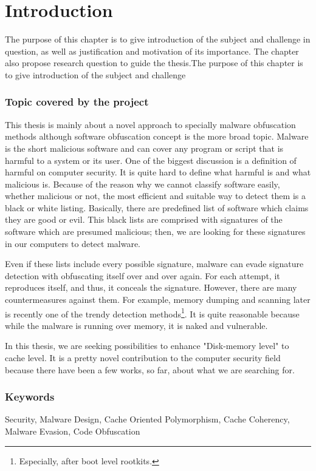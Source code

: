 \chapter{Introduction}
The purpose of this chapter is to give introduction of the subject and challenge in question, as well as justification and motivation of its importance. The chapter also propose research question to guide the thesis.The purpose of this chapter is to give introduction of the subject and challenge

\subsection{Topic covered by the project}
This thesis is mainly about a novel approach to specially malware obfuscation methods although software obfuscation concept is the more broad topic. Malware is the short malicious software and can cover any program or script that is harmful to a system or its user. One of the biggest discussion is a definition of harmful on computer security. It is quite hard to define what harmful is and what malicious is. Because of the reason why we cannot classify software easily, whether malicious or not, the most efficient and suitable way to detect them is a black or white listing. Basically, there are predefined list of software which claims they are good or evil. This black lists are comprised with signatures of the software which are presumed malicious; then, we are looking for these signatures in our computers to detect malware. 

Even if these lists include every possible signature, malware can evade signature detection with obfuscating itself over and over again. For each attempt, it reproduces itself, and thus, it conceals the signature. However, there are many countermeasures against them\cite{moser2007limits}\cite{egele2012survey}. For example, memory dumping and scanning later is recently one of the trendy detection methods\footnote{Especially, after boot level rootkits.}. It is quite reasonable because while the malware is running over memory, it is naked and vulnerable.

In this thesis, we are seeking possibilities to enhance "Disk-memory level" to cache level. It is a pretty novel contribution to the computer security field because there have been a few works, so far, about what we are searching for.


\subsection{Keywords}
Security, Malware Design, Cache Oriented Polymorphism, Cache Coherency, Malware Evasion, Code Obfuscation

